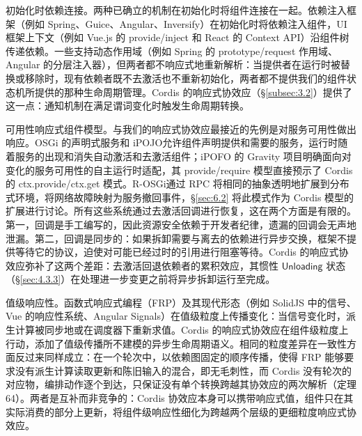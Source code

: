 初始化时依赖连接。两种已确立的机制在初始化时将组件连接在一起。依赖注入框架\cite{ref38}（例如 Spring\cite{ref117}、Guice、Angular、Inversify）在初始化时将依赖注入组件，UI 框架上下文（例如 Vue.js 的 provide/inject 和 React 的 Context API）沿组件树传递依赖。一些支持动态作用域（例如 Spring 的 prototype/request 作用域、Angular 的分层注入器），但两者都不响应式地重新解析：当提供者在运行时被替换或移除时，现有依赖者既不去激活也不重新初始化，两者都不提供我们的组件状态机所提供的那种生命周期管理。Cordis 的响应式协效应（\S\ref{subsec:3.2}）提供了这一点：通知机制在满足谓词变化时触发生命周期转换。

可用性响应式组件模型。与我们的响应式协效应最接近的先例是对服务可用性做出响应。OSGi 的声明式服务和 iPOJO\cite{ref118,ref119}允许组件声明提供和需要的服务，运行时随着服务的出现和消失自动激活和去激活组件；iPOFO 的 Gravity 项目\cite{ref119}明确面向对变化的服务可用性的自主运行时适配，其 provide/require 模型直接预示了 Cordis 的 ctx.provide/ctx.get 模式。R-OSGi\cite{ref53}通过 RPC 将相同的抽象透明地扩展到分布式环境，将网络故障映射为服务撤回事件，\S\ref{sec:6.2} 将此模式作为 Cordis 模型的扩展进行讨论。所有这些系统通过去激活回调进行恢复，这在两个方面是有限的。第一，回调是手工编写的，因此资源安全依赖于开发者纪律，遗漏的回调会无声地泄漏。第二，回调是同步的：如果拆卸需要与离去的依赖进行异步交换，框架不提供等待它的协议，迫使对可能已经过时的引用进行阻塞等待。Cordis 的响应式协效应弥补了这两个差距：去激活回退依赖者的累积效应，其惯性 $\mathsf{Unloading}$ 状态（\S\ref{sec:4.3.3}）在处理进一步变更之前将异步拆卸运行至完成。

值级响应性。函数式响应式编程（FRP）\cite{ref120}及其现代形态（例如 SolidJS 中的信号\cite{ref121,ref122}、Vue 的响应性系统、Angular Signals）在值级粒度上传播变化：当信号变化时，派生计算被同步地或在调度器下重新求值\cite{ref123}。Cordis 的响应式协效应在组件级粒度上行动，添加了值级传播所不建模的异步生命周期语义。相同的粒度差异在一致性方面反过来同样成立：在一个轮次中，以依赖图固定的顺序传播，使得 FRP 能够要求没有派生计算读取更新和陈旧输入的混合，即无毛刺性\cite{ref124}，而 Cordis 没有轮次的对应物，编排动作逐个到达，只保证没有单个转换跨越其协效应的两次解析（定理 64）。两者是互补而非竞争的：Cordis 协效应本身可以携带响应式值，组件只在其实际消费的部分上更新，将组件级响应性细化为跨越两个层级的更细粒度响应式协效应。
